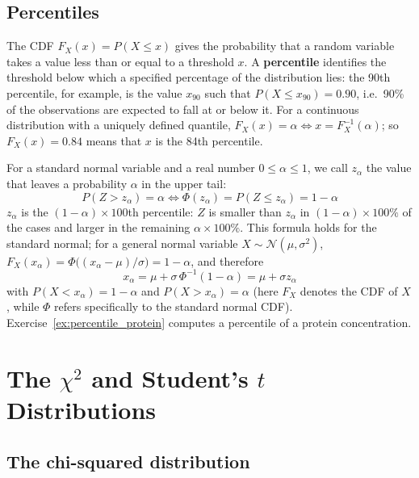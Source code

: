 \documentclass[letterpaper,11pt,leqno]{book}
\begin{document}
\subsection{Percentiles}
\label{sec:percentiles}

The CDF $F_X(x) = P(X \le x)$ gives the probability that a random variable takes a value less than or equal to a threshold $x$. A \textbf{percentile} identifies the threshold below which a specified percentage of the distribution lies: the 90th percentile, for example, is the value $x_{90}$ such that $P(X \le x_{90}) = 0.90$, i.e.\ 90\% of the observations are expected to fall at or below it. For a continuous distribution with a uniquely defined quantile, $F_X(x) = \alpha \iff x = F_X^{-1}(\alpha)$; so $F_X(x) = 0.84$ means that $x$ is the 84th percentile.

For a standard normal variable and a real number $0 \le \alpha \le 1$, we call $z_\alpha$ the value that leaves a probability $\alpha$ in the upper tail:
\begin{equation}
\boxed{P(Z > z_\alpha) = \alpha \iff \Phi(z_\alpha) = P(Z \le z_\alpha) = 1 - \alpha}
\label{eq:z_alpha}
\end{equation}
$z_\alpha$ is the $(1 - \alpha) \times 100$th percentile: $Z$ is smaller than $z_\alpha$ in $(1 - \alpha) \times 100\%$ of the cases and larger in the remaining $\alpha \times 100\%$. This formula holds for the standard normal; for a general normal variable $X \sim \mathcal{N}(\mu, \sigma^2)$, $F_X(x_\alpha) = \Phi\big((x_\alpha - \mu)/\sigma\big) = 1 - \alpha$, and therefore
\begin{equation}
\boxed{x_\alpha = \mu + \sigma\,\Phi^{-1}(1 - \alpha) = \mu + \sigma z_\alpha}
\label{eq:normal_percentile}
\end{equation}
with $P(X < x_\alpha) = 1 - \alpha$ and $P(X > x_\alpha) = \alpha$ (here $F_X$ denotes the CDF of $X$, while $\Phi$ refers specifically to the standard normal CDF). Exercise~\ref{ex:percentile_protein} computes a percentile of a protein concentration.

\section{The \texorpdfstring{$\chi^2$}{Chi-Squared} and Student's \texorpdfstring{$t$}{t} Distributions}
\label{sec:chi2_t}

\subsection{The chi-squared distribution}
\end{document}
